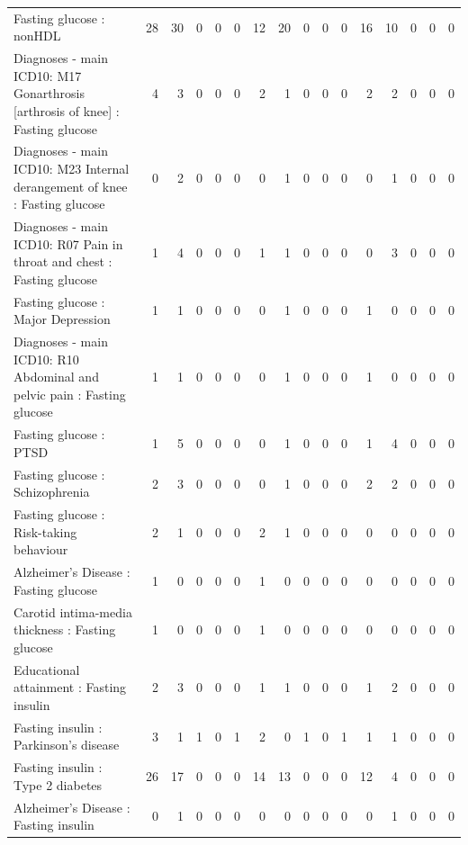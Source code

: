 \begin{table}[ht]
\begin{tabular}{lrrrrrrrrrrrrrrr}
  Fasting glucose : nonHDL &  28 &  30 &   0 &   0 &   0 &  12 &  20 &   0 &   0 &   0 &  16 &  10 &   0 &   0 &   0 \\ 
  Diagnoses - main ICD10: M17 Gonarthrosis [arthrosis of knee] : Fasting glucose &   4 &   3 &   0 &   0 &   0 &   2 &   1 &   0 &   0 &   0 &   2 &   2 &   0 &   0 &   0 \\ 
  Diagnoses - main ICD10: M23 Internal derangement of knee : Fasting glucose &   0 &   2 &   0 &   0 &   0 &   0 &   1 &   0 &   0 &   0 &   0 &   1 &   0 &   0 &   0 \\ 
  Diagnoses - main ICD10: R07 Pain in throat and chest : Fasting glucose &   1 &   4 &   0 &   0 &   0 &   1 &   1 &   0 &   0 &   0 &   0 &   3 &   0 &   0 &   0 \\ 
  Fasting glucose : Major Depression &   1 &   1 &   0 &   0 &   0 &   0 &   1 &   0 &   0 &   0 &   1 &   0 &   0 &   0 &   0 \\ 
  Diagnoses - main ICD10: R10 Abdominal and pelvic pain : Fasting glucose &   1 &   1 &   0 &   0 &   0 &   0 &   1 &   0 &   0 &   0 &   1 &   0 &   0 &   0 &   0 \\ 
  Fasting glucose : PTSD &   1 &   5 &   0 &   0 &   0 &   0 &   1 &   0 &   0 &   0 &   1 &   4 &   0 &   0 &   0 \\ 
  Fasting glucose : Schizophrenia &   2 &   3 &   0 &   0 &   0 &   0 &   1 &   0 &   0 &   0 &   2 &   2 &   0 &   0 &   0 \\ 
  Fasting glucose : Risk-taking behaviour &   2 &   1 &   0 &   0 &   0 &   2 &   1 &   0 &   0 &   0 &   0 &   0 &   0 &   0 &   0 \\ 
  Alzheimer's Disease : Fasting glucose &   1 &   0 &   0 &   0 &   0 &   1 &   0 &   0 &   0 &   0 &   0 &   0 &   0 &   0 &   0 \\ 
  Carotid intima-media thickness : Fasting glucose &   1 &   0 &   0 &   0 &   0 &   1 &   0 &   0 &   0 &   0 &   0 &   0 &   0 &   0 &   0 \\ 
  Educational attainment : Fasting insulin &   2 &   3 &   0 &   0 &   0 &   1 &   1 &   0 &   0 &   0 &   1 &   2 &   0 &   0 &   0 \\ 
  Fasting insulin : Parkinson's disease &   3 &   1 &   1 &   0 &   1 &   2 &   0 &   1 &   0 &   1 &   1 &   1 &   0 &   0 &   0 \\ 
  Fasting insulin : Type 2 diabetes &  26 &  17 &   0 &   0 &   0 &  14 &  13 &   0 &   0 &   0 &  12 &   4 &   0 &   0 &   0 \\ 
  Alzheimer's Disease : Fasting insulin &   0 &   1 &   0 &   0 &   0 &   0 &   0 &   0 &   0 &   0 &   0 &   1 &   0 &   0 &   0 \\ 

\end{tabular}
\end{table}

